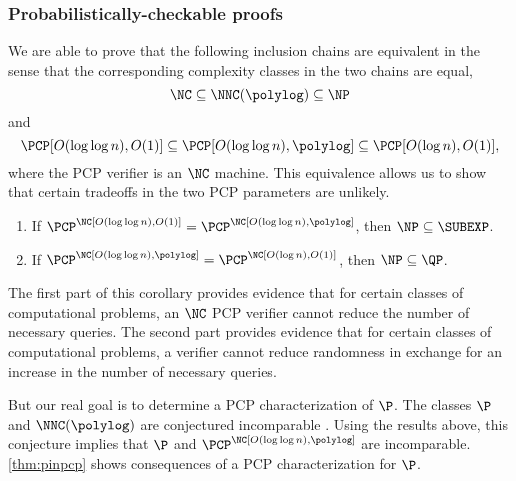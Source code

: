 \documentclass{article}
\begin{document}
\subsubsection{Probabilistically-checkable proofs}
\label{sec:ncpcp}

We are able to prove that the following inclusion chains are equivalent in the sense that the corresponding complexity classes in the two chains are equal,
\begin{equation*}
  \NC \subseteq \NNC(\polylog) \subseteq \NP
\end{equation*}
and
\begin{equation*}
  \PCP[O(\log \log n), O(1)] \subseteq \PCP[O(\log \log n), \polylog] \subseteq \PCP[O(\log n), O(1)],
\end{equation*}
where the PCP verifier is an $\NC$ machine.
This equivalence allows us to show that certain tradeoffs in the two PCP parameters are unlikely.
\begin{theorem}
  \mbox{}
  \begin{enumerate}
  \item If $\PCP^\NC[O(\log \log n), O(1)] = \PCP^\NC[O(\log \log n), \polylog]$, then $\NP \subseteq \SUBEXP$.
  \item If $\PCP^\NC[O(\log \log n), \polylog] = \PCP^\NC[O(\log n), O(1)]$, then $\NP \subseteq \QP$.
  \end{enumerate}
\end{theorem}

The first part of this corollary provides evidence that for certain classes of computational problems, an $\NC$ PCP verifier cannot reduce the number of necessary queries.
The second part provides evidence that for certain classes of computational problems, a verifier cannot reduce randomness in exchange for an increase in the number of necessary queries.

But our real goal is to determine a PCP characterization of $\P$.
The classes $\P$ and $\NNC(\polylog)$ are conjectured incomparable \autocite{wolf94}.
Using the results above, this conjecture implies that $\P$ and $\PCP^\NC[O(\log \log n), \polylog]$ are incomparable.
\autoref{thm:pinpcp} shows consequences of a PCP characterization for $\P$.
\end{document}
